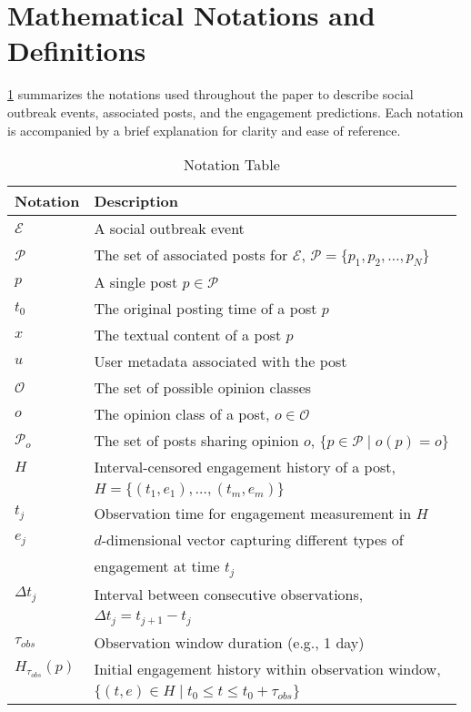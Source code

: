 \section{Mathematical Notations and Definitions}
\label{sec:appendix_notation}

\cref{tab:notations} summarizes the notations used throughout the paper to describe social outbreak events, associated posts, and the engagement predictions. Each notation is accompanied by a brief explanation for clarity and ease of reference.
\begin{table}[htb]
\caption{Notation Table}
\label{tab:notations}
\begin{adjustbox}{max width=1.0\linewidth}
\begin{tabular}{ll}
\toprule
\toprule
\textbf{Notation} & \textbf{Description} \\
\midrule
$\mathcal{E}$ & A social outbreak event \\
$\mathcal{P}$ & The set of associated posts for $\mathcal{E}$, $\mathcal{P} = \{p_1, p_2, \dots, p_N\}$ \\
$p$ & A single post $p \in \mathcal{P}$ \\
$t_0$ & The original posting time of a post $p$ \\
$x$ & The textual content of a post $p$ \\
$u$ & User metadata associated with the post \\
$\mathcal{O}$ & The set of possible opinion classes \\
$o$ & The opinion class of a post, $o \in \mathcal{O}$ \\
$\mathcal{P}_o$ & The set of posts sharing opinion $o$, $\{p \in \mathcal{P} \mid o(p) = o\}$ \\
$H$ & Interval-censored engagement history of a post, \\ & $H = \{(t_1, e_1), \dots, (t_m, e_m)\}$ \\
$t_j$ & Observation time for engagement measurement in $H$ \\
$e_j$ & $d$-dimensional vector capturing different types of \\ & engagement at time $t_j$ \\
$\Delta t_j$ & Interval between consecutive observations, \\ & $\Delta t_j = t_{j+1} - t_j$ \\
$\tau_{obs}$ & Observation window duration (e.g., 1 day) \\
$H_{\tau_{obs}}(p)$ & Initial engagement history within observation window, \\ & $\{(t, e) \in H \mid t_0 \leq t \leq t_0 + \tau_{obs}\}$ \\

\end{tabular}
\end{adjustbox}
\end{table}

